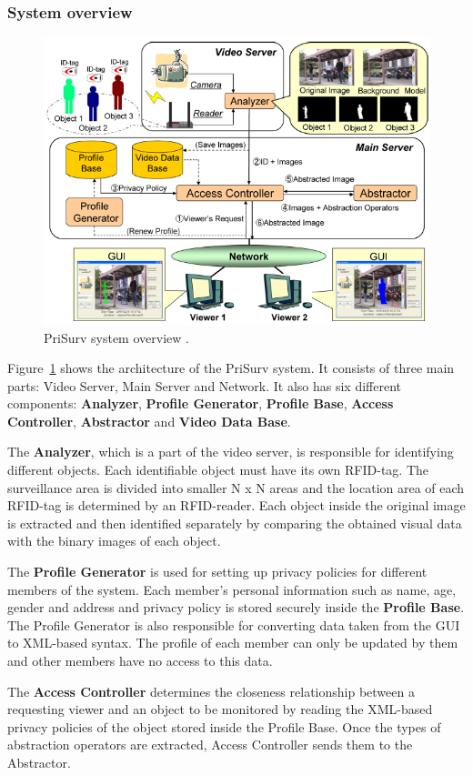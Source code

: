 \documentclass[conference]{IEEEtran}
\begin{document}
\subsubsection{System overview}

\begin{figure}[t]
\centerline{\includegraphics[width=.5\textwidth]{img//prisurv_arch.png}}
\caption{PriSurv system overview \cite{chinomi2008PriSurv}.}
\label{fig:prisurv2}
\end{figure}

Figure~\ref{fig:prisurv2} shows the architecture of the PriSurv system. It consists of three main parts: Video Server, Main Server and Network. It also has six different components: \textbf{Analyzer}, \textbf{Profile Generator}, \textbf{Profile Base}, \textbf{Access Controller}, \textbf{Abstractor} and \textbf{Video Data Base}. 

The \textbf{Analyzer}, which is a part of the video server, is responsible for identifying different objects. Each identifiable object must have its own \ac{RFID}-tag. The surveillance area is divided into smaller N x N areas and the location area of each \ac{RFID}-tag is determined by an \ac{RFID}-reader. Each object inside the original image is extracted and then identified separately by comparing the obtained visual data with the binary images of each object. 

The \textbf{Profile Generator} is used for setting up privacy policies for different members of the system. Each member's personal information such as name, age, gender and address and privacy policy is stored securely inside the \textbf{Profile Base}. The Profile Generator is also responsible for converting data taken from the GUI to \ac{XML}-based syntax. The profile of each member can only be updated by them and other members have no access to this data. 

The \textbf{Access Controller} determines the closeness relationship between a requesting viewer and an object to be monitored by reading the \ac{XML}-based privacy policies of the object stored inside the Profile Base. Once the types of abstraction operators are extracted, Access Controller sends them to the Abstractor. 
\end{document}
